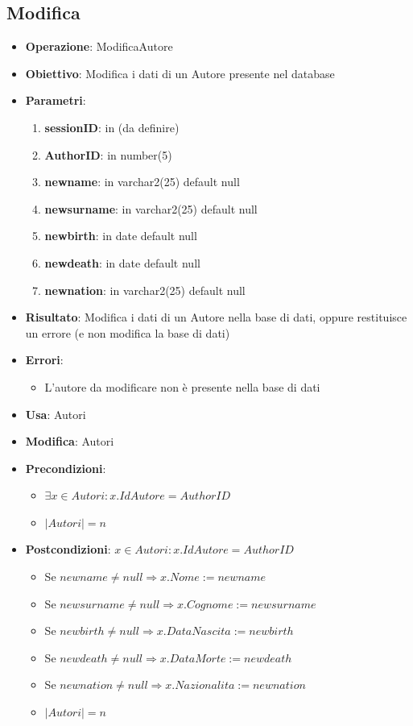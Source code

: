 \documentclass[a4paper,11pt]{article}
\begin{document}
\subsection{Modifica}
\begin{itemize}
	\item \textbf{Operazione}: ModificaAutore
	\item \textbf{Obiettivo}: Modifica i dati di un Autore presente nel database
	\item \textbf{Parametri}:
	\begin{enumerate}
		\item \textbf{sessionID}: in (da definire)
		\item \textbf{AuthorID}: in number(5)
		\item \textbf{newname}: in varchar2(25) default null
		\item \textbf{newsurname}: in varchar2(25) default null
		\item \textbf{newbirth}: in date default null
		\item \textbf{newdeath}: in date default null
		\item \textbf{newnation}: in varchar2(25) default null
	\end{enumerate}
	\item \textbf{Risultato}: Modifica i dati di un Autore nella base di dati, oppure restituisce un errore (e non modifica la base di dati)
	\item \textbf{Errori}: 
	\begin{itemize}
		\item L'autore da modificare non è presente nella base di dati
	\end{itemize}
	\item \textbf{Usa}: Autori
	\item \textbf{Modifica}: Autori
	\item \textbf{Precondizioni}:
	\begin{itemize}
		\item $\exists x \in Autori : x.IdAutore = AuthorID$
		\item $|Autori| = n$
	\end{itemize}
	\item \textbf{Postcondizioni}: $x \in Autori : x.IdAutore = AuthorID$
	\begin{itemize}
		\item Se $newname \ne null \Rightarrow x.Nome := newname$
		\item Se $newsurname \ne null \Rightarrow x.Cognome := newsurname$
		\item Se $newbirth \ne null \Rightarrow x.DataNascita := newbirth$
		\item Se $newdeath \ne null \Rightarrow x.DataMorte := newdeath$
		\item Se $newnation \ne null \Rightarrow x.Nazionalita := newnation$
		\item $|Autori| = n$
	\end{itemize}
\end{itemize}
\end{document}
